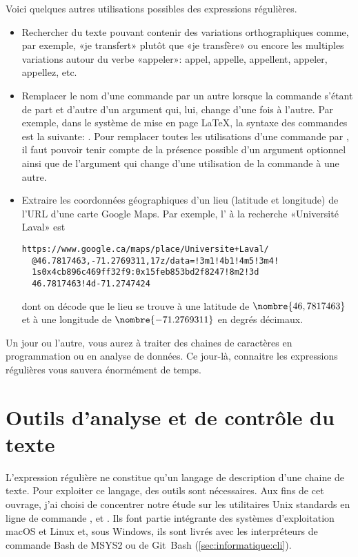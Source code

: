 Voici quelques autres utilisations possibles des expressions
régulières.
\begin{itemize}
\item Rechercher du texte pouvant contenir des variations
  orthographiques comme, par exemple, «je transfert» plutôt que «je
  transfère» ou encore les multiples variations autour du verbe
  «appeler»: appel, appelle, appellent, appeler, appellez, etc.
\item Remplacer le nom d'une commande par un autre lorsque la commande
  s'étant de part et d'autre d'un argument qui, lui, change d'une fois
  à l'autre. Par exemple, dans le système de mise en page {\LaTeX}, la
  syntaxe des commandes est la suivante:
  \cmd{\cmd}. Pour remplacer toutes les
  utilisations d'une commande \cmd{\foo} par \cmd{\bar}, il faut
  pouvoir tenir compte de la présence possible d'un argument optionnel
   ainsi que de l'argument  qui change d'une
  utilisation de la commande à une autre.
\item Extraire les coordonnées géographiques d'un lieu (latitude et
  longitude) de l'URL d'une carte Google Maps. Par exemple, l'%
   à la recherche «Université Laval» est
  \begin{Schunk}
\begin{Verbatim}
https://www.google.ca/maps/place/Universite+Laval/
  @46.7817463,-71.2769311,17z/data=!3m1!4b1!4m5!3m4!
  1s0x4cb896c469ff32f9:0x15feb853bd2f8247!8m2!3d
  46.7817463!4d-71.2747424
\end{Verbatim}
  \end{Schunk}
  dont on décode que le lieu se trouve à une latitude de
  $\nombre{46,7817463}$ et à une longitude de $\nombre{-71.2769311}$
  en degrés décimaux.
\end{itemize}

Un jour ou l'autre, vous aurez à traiter des chaines de caractères en
programmation ou en analyse de données. Ce jour-là, connaitre les
expressions régulières vous sauvera énormément de temps.


\section{Outils d'analyse et de contrôle du texte}
\label{sec:texte:outils}

L'expression régulière ne constitue qu'un langage de description d'une
chaine de texte. Pour exploiter ce langage, des outils sont
nécessaires. Aux fins de cet ouvrage, j'ai choisi de concentrer notre
étude sur les utilitaires Unix standards en ligne de commande
,  et . Ils font partie intégrante des
systèmes d'exploitation macOS et Linux et, sous Windows, ils sont
livrés avec les interpréteurs de commande Bash de MSYS2
ou de Git~Bash (\autoref{sec:informatique:cli}).

